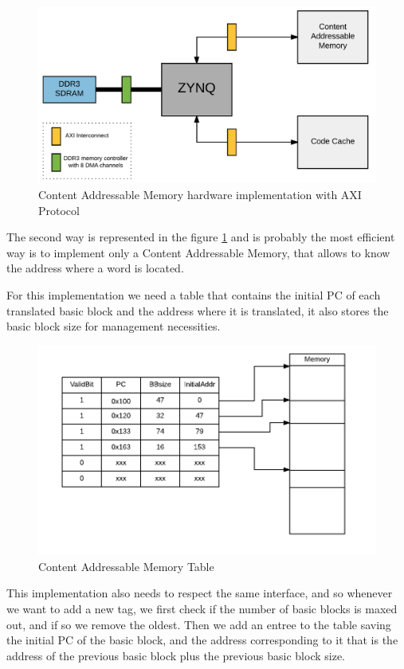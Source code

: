 \begin{figure} [H]
	\centering
	\includegraphics[scale = 0.2]{images/DesignHw2.png}
	\caption{Content Addressable Memory hardware implementation with AXI Protocol}
	\label{fig:CAM_Hw}
\end{figure}

The second way is represented in the figure \ref{fig:CAM_Hw} and is probably the most efficient way is to implement only a Content Addressable Memory, that allows to know the address where a word is located. 

For this implementation we need a table that contains the initial PC of each translated basic block and the address where it is translated, it also stores the basic block size for management necessities.

\begin{figure} [H]
	\centering
	\includegraphics[scale = 0.35]{images/CAM.png}
	\caption{Content Addressable Memory Table}
	\label{fig:CAM_table}
\end{figure}

This implementation also needs to respect the same interface, and so whenever we want to add a new tag, we first check if the number of basic blocks is maxed out, and if so we remove the oldest. Then we add an entree to the table saving the initial PC of the basic block, and the address corresponding to it that is the address of the previous basic block plus the previous basic block size.

